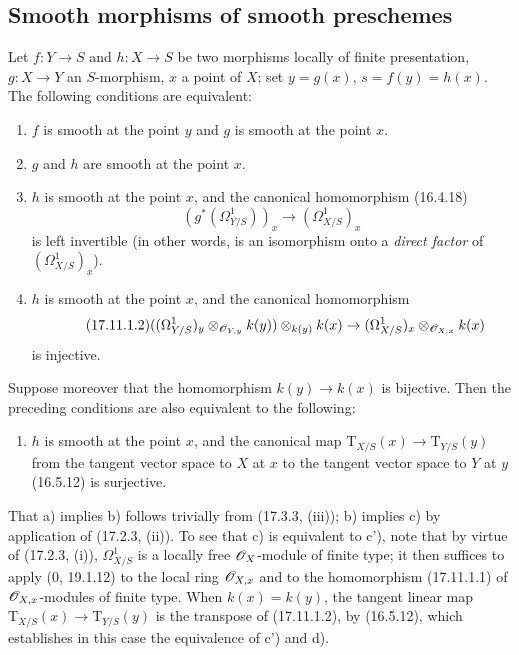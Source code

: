 \subsection{Smooth morphisms of smooth preschemes}

\begin{theorem}[17.11.1]
\label{IV.17.11.1}
Let $f:Y\to S$ and $h:X\to S$ be two morphisms locally of finite presentation, $g:X\to Y$ an $S$-morphism, $x$ a point of $X$; set $y=g(x)$, $s=f(y)=h(x)$. The following conditions are equivalent:
\begin{enumerate}
  \item[a)] $f$ is smooth at the point $y$ and $g$ is smooth at the point $x$.
  \item[b)] $g$ and $h$ are smooth at the point $x$.
  \item[c)] $h$ is smooth at the point $x$, and the canonical homomorphism (16.4.18)
  \begin{equation}
  \label{IV.17.11.1.1}
  \tag{17.11.1.1}
  (g^*(\Omega^1_{Y/S}))_x\to(\Omega^1_{X/S})_x
  \end{equation}
  is left invertible (in other words, is an isomorphism onto a \emph{direct factor} of $(\Omega^1_{X/S})_x$).
  \item[c')] $h$ is smooth at the point $x$, and the canonical homomorphism
  \begin{equation}
  \label{IV.17.11.1.2}
  \tag{17.11.1.2}
  ((\Omega^1_{Y/S})_y\otimes_{\mathscr{O}_{Y,y}}k(y))\otimes_{k(y)}k(x)\to(\Omega^1_{X/S})_x\otimes_{\mathscr{O}_{X,x}}k(x)
  \end{equation}
  is injective.
\end{enumerate}
Suppose moreover that the homomorphism $k(y)\to k(x)$ is bijective. Then the preceding conditions are also equivalent to the following:
\begin{enumerate}
  \item[d)] $h$ is smooth at the point $x$, and the canonical map $\mathrm{T}_{X/S}(x)\to\mathrm{T}_{Y/S}(y)$ from the tangent vector space to $X$ at $x$ to the tangent vector space to $Y$ at $y$ (16.5.12) is surjective.
\end{enumerate}
\end{theorem}

That a) implies b) follows trivially from (17.3.3, (iii)); b) implies c) by application of (17.2.3, (ii)). To see that c) is equivalent to c'), note that by virtue of (17.2.3, (i)), $\Omega^1_{X/S}$ is a locally free $\mathscr{O}_X$-module of finite type; it then suffices to apply (0, 19.1.12) to the local ring $\mathscr{O}_{X,x}$ and to the homomorphism (17.11.1.1) of $\mathscr{O}_{X,x}$-modules of finite type. When $k(x)=k(y)$, the tangent linear map $\mathrm{T}_{X/S}(x)\to\mathrm{T}_{Y/S}(y)$ is the transpose of (17.11.1.2), by (16.5.12), which establishes in this case the equivalence of c') and d).

